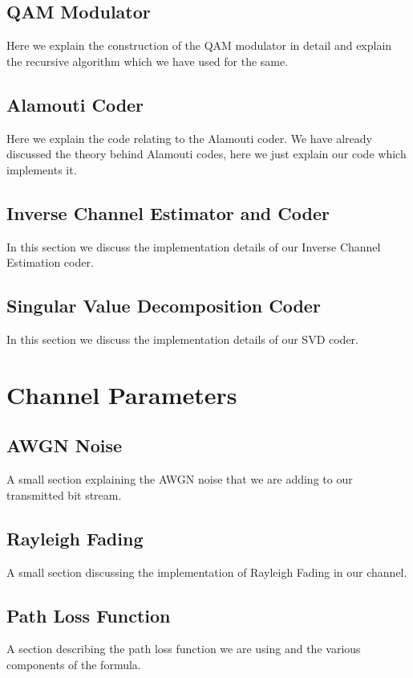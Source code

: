 \subsection{QAM Modulator}
Here we explain the construction of the QAM modulator in detail and explain the recursive algorithm which we have used for the same.

\subsection{Alamouti Coder}
Here we explain the code relating to the Alamouti coder. We have already discussed the theory behind Alamouti codes, here we just explain our code which implements it.


\subsection{Inverse Channel Estimator and Coder}
In this section we discuss the implementation details of our Inverse Channel Estimation coder.


\subsection{Singular Value Decomposition Coder}
In this section we discuss the implementation details of our SVD coder. 

\section{Channel Parameters}

\subsection{AWGN Noise}
A small section explaining the AWGN noise that we are adding to our transmitted bit stream.

\subsection{Rayleigh Fading}
A small section discussing the implementation of Rayleigh Fading in our channel.

\subsection{Path Loss Function}
A section describing the path loss function we are using and the various components of the formula.


